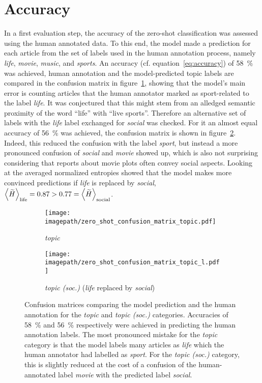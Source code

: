 \section{Accuracy}\label{ch:supervised_accuracy}
In a first evaluation step, the accuracy of the zero-shot classification was assessed using the human annotated data. To this end, the model made a prediction for each article from the set of labels used in the human annotation process, namely \textit{life}, \textit{movie}, \textit{music}, and \textit{sports}. An accuracy (cf. equation~\ref{eq:accuracy}) of \SI{58}{\percent} was achieved, human annotation and the model-predicted topic labels are compared in the confusion matrix in figure~\ref{fig:zero_shot_confusion_matrix_topic}, showing that the model's main error is counting articles that the human annotator marked as sport-related to the label \textit{life}. It was conjectured that this might stem from an alledged semantic proximity of the word ``life'' with ``live sports''. Therefore an alternative set of labels with the \textit{life} label exchanged for \textit{social} was checked. For it an almost equal accuracy of \SI{56}{\percent} was achieved, the confusion matrix is shown in figure~\ref{fig:zero_shot_confusion_matrix_topic_l}. Indeed, this reduced the confusion with the label \textit{sport}, but instead a more pronounced confusion of \textit{social} and \textit{movie} showed up, which is also not surprising considering that reports about movie plots often convey social aspects. Looking at the averaged normalized entropies showed that the model makes more convinced predictions if \textit{life} is replaced by \textit{social}, $\Braket{\widetilde{H}}_\text{life} = 0.87 > 0.77 = \Braket{\widetilde{H}}_\text{social}$.

\begin{figure}
    \centering
    \begin{subfigure}{0.48\textwidth}
        \centering
        \texttt{[image: \\imagepath/zero\_shot\_confusion\_matrix\_topic.pdf]}
        \caption{\textit{topic}}\label{fig:zero_shot_confusion_matrix_topic}
    \end{subfigure}
    \hspace{0.03\textwidth}
    \begin{subfigure}{0.48\textwidth}
        \centering
        \texttt{[image: \\imagepath/zero\_shot\_confusion\_matrix\_topic\_l.pdf]}
        \caption{\textit{topic (soc.)} (\textit{life} replaced by \textit{social})}\label{fig:zero_shot_confusion_matrix_topic_l}
    \end{subfigure}
    \caption{Confusion matrices comparing the model prediction and the human annotation for the \textit{topic} and \textit{topic (soc.)} categories. Accuracies of \SI{58}{\percent} and \SI{56}{\percent} respectively were achieved in predicting the human annotation labels. The most pronounced mistake for the \textit{topic} category is that the model labels many articles as \textit{life} which the human annotator had labelled as \textit{sport}. For the \textit{topic (soc.)} category, this is slightly reduced at the cost of a confusion of the human-annotated label \textit{movie} with the predicted label \textit{social}.}\label{fig:zero_shot_confusion_matrices}
\end{figure}

